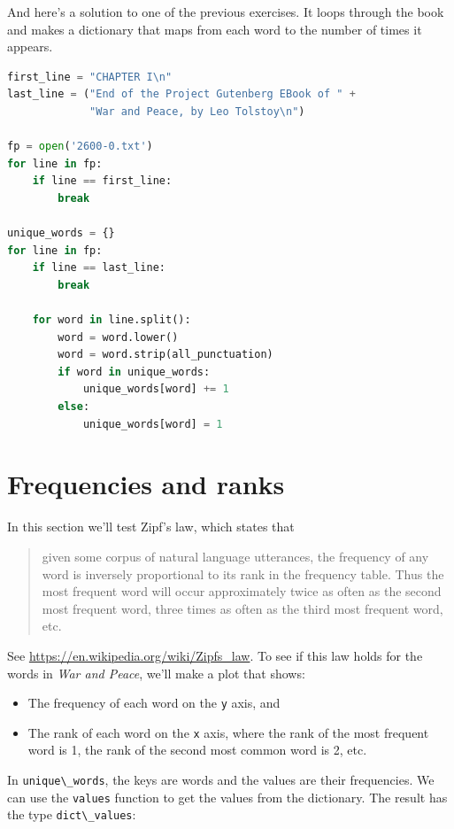 And here's a solution to one of the previous exercises. It loops through
the book and makes a dictionary that maps from each word to the number
of times it appears.

\begin{lstlisting}[language=Python]
first_line = "CHAPTER I\n"
last_line = ("End of the Project Gutenberg EBook of " +
             "War and Peace, by Leo Tolstoy\n")

fp = open('2600-0.txt')
for line in fp:
    if line == first_line:
        break

unique_words = {}
for line in fp:
    if line == last_line:
        break
        
    for word in line.split():
        word = word.lower()
        word = word.strip(all_punctuation)
        if word in unique_words:
            unique_words[word] += 1
        else:
            unique_words[word] = 1
\end{lstlisting}

\hypertarget{frequencies-and-ranks}{%
\section{Frequencies and ranks}\label{frequencies-and-ranks}}

In this section we'll test Zipf's law, which states that

\begin{quote}
given some corpus of natural language utterances, the frequency of any
word is inversely proportional to its rank in the frequency table. Thus
the most frequent word will occur approximately twice as often as the
second most frequent word, three times as often as the third most
frequent word, etc.
\end{quote}

See \url{https://en.wikipedia.org/wiki/Zipfs_law}. To see if this law
holds for the words in \emph{War and Peace}, we'll make a plot that
shows:

\begin{itemize}
\item
  The frequency of each word on the \passthrough{\lstinline!y!} axis,
  and
\item
  The rank of each word on the \passthrough{\lstinline!x!} axis, where
  the rank of the most frequent word is 1, the rank of the second most
  common word is 2, etc.
\end{itemize}

In \passthrough{\lstinline!unique\_words!}, the keys are words and the
values are their frequencies. We can use the
\passthrough{\lstinline!values!} function to get the values from the
dictionary. The result has the type
\passthrough{\lstinline!dict\_values!}:

